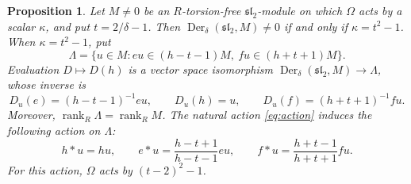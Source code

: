 \documentclass[11pt,reqno]{amsart}
\numberwithin{equation}{section}
\newcommand{\s}{\mathfrak{sl}_2}
\DeclareMathOperator{\Der}{Der}
\DeclareMathOperator{\rank}{rank}
\newtheorem{proposition}[theorem]{Proposition}
\theoremstyle{definition}
\theoremstyle{remark}
\begin{document}
\begin{proposition}\label{prop:evaluation}
Let \(M\ne0\) be an \(R\)-torsion-free \(\s\)-module on
which \(\Omega\) acts by a scalar \(\kappa\), and put \(t=2/\delta-1\).
Then \(\Der_\delta(\s,M)\ne0\) if and only if \(\kappa=t^2-1\).
When \(\kappa=t^2-1\), put
\begin{equation}\label{eq:lattice}
\Lambda=\{u\in M:eu\in(h-t-1)M,\ fu\in(h+t+1)M\}.
\end{equation}
Evaluation \(D\mapsto D(h)\) is a vector space isomorphism
\(\Der_\delta(\s,M)\to\Lambda\), whose inverse is
\begin{equation}\label{eq:Du}
D_u(e)=(h-t-1)^{-1}eu,\qquad D_u(h)=u,\qquad
D_u(f)=(h+t+1)^{-1}fu.
\end{equation}
Moreover, \(\rank_R\Lambda=\rank_R M\).
The natural action \eqref{eq:action} induces the following action on \(\Lambda\):
\begin{equation}\label{eq:transport}
h*u=hu,\qquad e*u=\frac{h-t+1}{h-t-1}eu,\qquad
f*u=\frac{h+t-1}{h+t+1}fu.
\end{equation}
For this action, \(\Omega\) acts by \((t-2)^2-1\).
\end{proposition}
\end{document}
